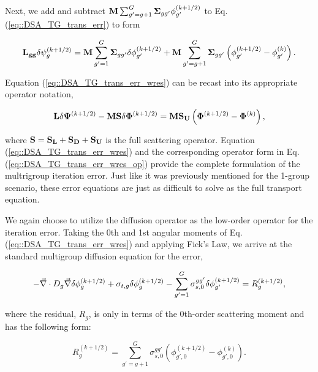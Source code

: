 \noindent Next, we add and subtract ${\bf M} \sum_{g'=g+1}^G {\bf \Sigma}_{g g'} \phi_{g'}^{(k+1/2)}$ to Eq. (\ref{eq::DSA_TG_trans_err}) to form

\begin{equation}
\label{eq::DSA_TG_trans_err_wres}
{\bf L_{gg}} \delta \psi_g^{(k+1/2)} = {\bf M} \sum_{g'=1}^G {\bf \Sigma}_{g g'}\delta \phi_{g'}^{(k+1/2)} + {\bf M} \sum_{g'=g+1}^G {\bf \Sigma}_{g g'} \left( \phi_{g'}^{(k+1/2)} - \phi_{g'}^{(k)} \right) .
\end{equation}

\noindent Equation (\ref{eq::DSA_TG_trans_err_wres}) can be recast into its appropriate operator notation,

\begin{equation}
\label{eq::DSA_TG_trans_err_wres_op}
{\bf L} \delta {\bf \Psi}^{(k+1/2)} - {\bf M}   {\bf S} \delta {\bf \Phi}^{(k+1/2)} = {\bf M} {\bf S_U}  \left( {\bf \Phi}^{(k+1/2)} - {\bf \Phi}^{(k)} \right),
\end{equation}

\noindent where ${\bf S} = {\bf S_L} + {\bf S_D} +{\bf S_U} $ is the full scattering operator. Equation (\ref{eq::DSA_TG_trans_err_wres}) and the corresponding operator form in Eq. (\ref{eq::DSA_TG_trans_err_wres_op}) provide the complete formulation of the multrigroup iteration error. Just like it was previously mentioned for the 1-group scenario, these error equations are just as difficult to solve as the full transport equation. 

We again choose to utilize the diffusion operator as the low-order operator for the iteration error. Taking the 0th and 1st angular moments of Eq. (\ref{eq::DSA_TG_trans_err_wres}) and applying Fick's Law, we arrive at the standard multigroup diffusion equation for the error,

\begin{equation}
\label{eq::DSA_TG_diff_err_full}
-\vec{\nabla} \cdot D_g \vec{\nabla} \delta \phi_{g}^{(k+1/2)} + \sigma_{t,g} \delta \phi_{g}^{(k+1/2)} - \sum\displaylimits_{g'=1}^{G} \sigma_{s,0}^{g g'} \delta \phi_{g'}^{(k+1/2)} = R_g^{(k+1/2)} ,
\end{equation}

\noindent where the residual, $R_g$, is only in terms of the 0th-order scattering moment and has the following form:

\begin{equation}
\label{eq::DSA_TG_diff_residual}
R_g^{(k+1/2)} = \sum_{g'=g+1}^G \sigma_{s,0}^{g g'} \left( \phi_{g',0}^{(k+1/2)} - \phi_{g',0}^{(k)} \right) .
\end{equation}

